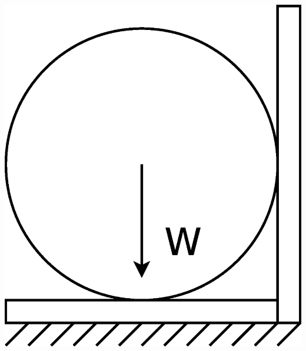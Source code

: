 \documentclass[a4paper,12pt]{book}
\begin{document}
\begin{enumerate}
\begin{adjustbox}{valign=t}
\begin{minipage}[t]{0.3\linewidth}
				  \includegraphics[width=\textwidth]{test_env.eps} 
				\end{minipage} 	
			\end{adjustbox} 
\end{enumerate}
\end{document}
